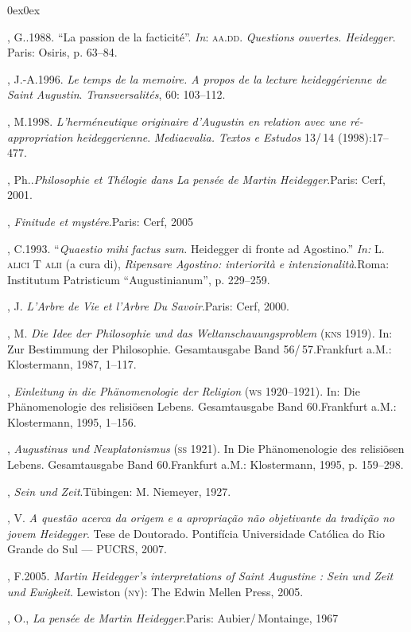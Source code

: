 \begin{description}0ex\parsep0ex
\newcommand{\tit}[1]{\item[\textnormal{\textsc{\MakeTextLowercase{#1}}}]}
\newcommand{\titidem}{\item[\line(1,0){25}]}
\tit{AGABEM}, G..1988. ``{La passion de la facticité}''.
\emph{In}: \textsc{aa}.\textsc{dd}. \emph{Questions ouvertes. Heidegger}.
Paris: Osiris, p. 63--84.

\tit{BARASH}, J.-A.1996. \emph{Le temps de la memoire. A propos de la
lecture heideggérienne de Saint Augustin}.
\emph{Transversalités}, 60: 103--112.

\tit{BRITO MARTINS}, M.1998. \emph{L'herméneutique originaire
d'Augustin en relation avec une ré-appropriation
heideggerienne}. \emph{Mediaeval}\emph{ia. Textos e Estudos}
13/\,14 (1998):17--477.

\tit{CAPELLE}, Ph..\emph{Philosophie et Thélogie dans La pensée de
Martin Heidegger}.Paris: Cerf, 2001.

\titidem, \emph{Finitude et mystére}.Paris:
Cerf, 2005

\tit{ESPOSITO}, C.1993. ``\emph{Quaestio mihi factus sum.}
Heidegger di fronte ad Agostino.'' \emph{In}\emph{:}
L. \textsc{alici} T \textsc{alii} (a cura di), \emph{Ripensare Agostino:
interiorità e intenzionalità}.Roma: Institutum Patristicum
“Augustinianum”, p. 229--259.

\tit{GREISCH}, J. \emph{L'Arbre de Vie et l'Arbre Du Savoir}.Paris:
Cerf, 2000.

\tit{HEIDEGGER}, M. \emph{Die Idee der Philosophie und das
Weltanschauungsproblem} (\textsc{kns} 1919)\emph{.} In: Zur Bestimmung
der Philosophie. Gesamtausgabe Band 56/\,57.Frankfurt a.M.:
Klostermann, 1987, 1--117.

\titidem, \emph{Einleitung in die
Phänomenologie der Religion} (\textsc{ws} 1920--1921). In: Die
Phänomenologie des relisiösen Lebens. Gesamtausgabe Band
60.Frankfurt a.M.: Klostermann, 1995, 1--156.

\titidem, \emph{Augustinus und
Neuplatonismus} (\textsc{ss} 1921). In Die Phänomenologie des relisiösen
Lebens. Gesamtausgabe Band 60.Frankfurt a.M.: Klostermann, 1995,
p. 159--298.

\titidem, \emph{Sein und Zeit}.Tübingen: M.
Niemeyer, 1927.

\tit{SASSI}, V. \emph{A questão acerca da origem e a apropriação
não objetivante da tradição no jovem Heidegger}. Tese de
Doutorado. Pontifícia Universidade Católica do Rio Grande do Sul
--- PUCRS, 2007.

\tit{ FLETEREN}, F.2005. \emph{Martin Heidegger's
interpretations of Saint Augustine : Sein und Zeit und
Ewigkeit}. Lewiston (\textsc{ny}): The Edwin Mellen Press, 2005.

\tit{PÖGGELER}, O., \emph{La pensée de Martin Heidegger}.Paris:
Aubier/\,Montainge, 1967
\end{description}

